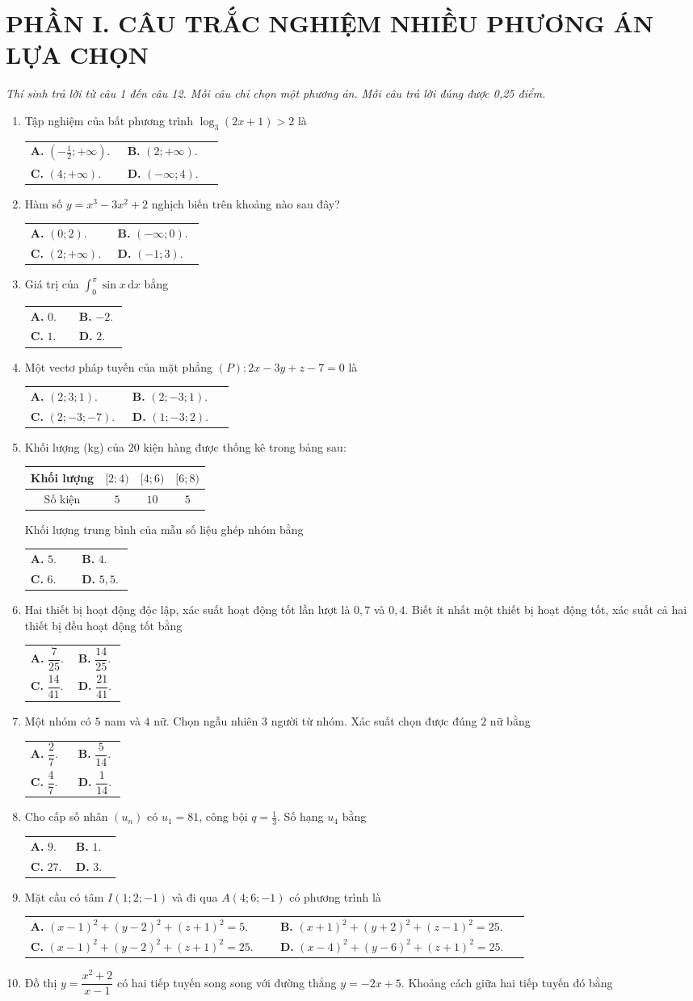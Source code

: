 \documentclass[12pt,a4paper]{article}
\makeatletter
\newcommand{\bonpa}[4]{\par\smallskip\noindent
\begin{tabular}{@{}p{0.47\linewidth}p{0.47\linewidth}@{}}
\textbf{A.} #1 & \textbf{B.} #2\\[3pt]
\textbf{C.} #3 & \textbf{D.} #4\end{tabular}}
\makeatother
\begin{document}
\section*{\large PHẦN I. CÂU TRẮC NGHIỆM NHIỀU PHƯƠNG ÁN LỰA CHỌN}
\textit{Thí sinh trả lời từ câu 1 đến câu 12. Mỗi câu chỉ chọn một phương án. Mỗi câu trả lời đúng được 0,25 điểm.}
\begin{enumerate}
\item Tập nghiệm của bất phương trình $\log_3(2x+1)>2$ là
\bonpa{$(-\tfrac12;+\infty)$.}{$(2;+\infty)$.}{$(4;+\infty)$.}{$(-\infty;4)$.}
\item Hàm số $y=x^3-3x^2+2$ nghịch biến trên khoảng nào sau đây?
\bonpa{$(0;2)$.}{$(-\infty;0)$.}{$(2;+\infty)$.}{$(-1;3)$.}
\item Giá trị của $\displaystyle\int_0^{\pi}\sin x\,\mathrm dx$ bằng
\bonpa{$0$.}{$-2$.}{$1$.}{$2$.}
\item Một vectơ pháp tuyến của mặt phẳng $(P):2x-3y+z-7=0$ là
\bonpa{$(2;3;1)$.}{$(2;-3;1)$.}{$(2;-3;-7)$.}{$(1;-3;2)$.}
\item Khối lượng (kg) của $20$ kiện hàng được thống kê trong bảng sau:
\begin{center}\begin{tabular}{|c|c|c|c|}\hline
Khối lượng & $[2;4)$ & $[4;6)$ & $[6;8)$\\\hline
Số kiện & $5$ & $10$ & $5$\\\hline\end{tabular}\end{center}
Khối lượng trung bình của mẫu số liệu ghép nhóm bằng
\bonpa{$5$.}{$4$.}{$6$.}{$5{,}5$.}
\item Hai thiết bị hoạt động độc lập, xác suất hoạt động tốt lần lượt là $0{,}7$ và $0{,}4$. Biết ít nhất một thiết bị hoạt động tốt, xác suất cả hai thiết bị đều hoạt động tốt bằng
\bonpa{$\dfrac7{25}$.}{$\dfrac{14}{25}$.}{$\dfrac{14}{41}$.}{$\dfrac{21}{41}$.}
\item Một nhóm có $5$ nam và $4$ nữ. Chọn ngẫu nhiên $3$ người từ nhóm. Xác suất chọn được đúng $2$ nữ bằng
\bonpa{$\dfrac27$.}{$\dfrac5{14}$.}{$\dfrac47$.}{$\dfrac1{14}$.}
\item Cho cấp số nhân $(u_n)$ có $u_1=81$, công bội $q=\tfrac13$. Số hạng $u_4$ bằng
\bonpa{$9$.}{$1$.}{$27$.}{$3$.}
\item Mặt cầu có tâm $I(1;2;-1)$ và đi qua $A(4;6;-1)$ có phương trình là
\bonpa{$(x-1)^2+(y-2)^2+(z+1)^2=5$.}{$(x+1)^2+(y+2)^2+(z-1)^2=25$.}{$(x-1)^2+(y-2)^2+(z+1)^2=25$.}{$(x-4)^2+(y-6)^2+(z+1)^2=25$.}
\item Đồ thị $y=\dfrac{x^2+2}{x-1}$ có hai tiếp tuyến song song với đường thẳng $y=-2x+5$. Khoảng cách giữa hai tiếp tuyến đó bằng

\end{enumerate}
\end{document}
